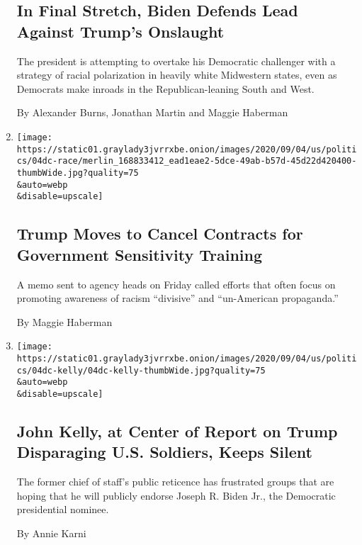 \begin{enumerate}
  \hypertarget{in-final-stretch-biden-defends-lead-against-trumps-onslaught}{%
  \subsection{In Final Stretch, Biden Defends Lead Against Trump's
  Onslaught}\label{in-final-stretch-biden-defends-lead-against-trumps-onslaught}}

  The president is attempting to overtake his Democratic challenger with
  a strategy of racial polarization in heavily white Midwestern states,
  even as Democrats make inroads in the Republican-leaning South and
  West.

  By Alexander Burns, Jonathan Martin and Maggie Haberman
\item
  \href{/2020/09/04/us/politics/trump-race-sensitivity-training.html}{}

  \texttt{[image: https://static01.graylady3jvrrxbe.onion/images/2020/09/04/us/politics/04dc-race/merlin\_168833412\_ead1eae2-5dce-49ab-b57d-45d22d420400-thumbWide.jpg?quality=75\\\&auto=webp\\\&disable=upscale]}

  \hypertarget{trump-moves-to-cancel-contracts-for-government-sensitivity-training}{%
  \subsection{Trump Moves to Cancel Contracts for Government Sensitivity
  Training}\label{trump-moves-to-cancel-contracts-for-government-sensitivity-training}}

  A memo sent to agency heads on Friday called efforts that often focus
  on promoting awareness of racism ``divisive'' and ``un-American
  propaganda.''

  By Maggie Haberman
\item
  \href{/2020/09/04/us/politics/kelly-trump.html}{}

  \texttt{[image: https://static01.graylady3jvrrxbe.onion/images/2020/09/04/us/politics/04dc-kelly/04dc-kelly-thumbWide.jpg?quality=75\\\&auto=webp\\\&disable=upscale]}

  \hypertarget{john-kelly-at-center-of-report-on-trump-disparaging-us-soldiers-keeps-silent}{%
  \subsection{John Kelly, at Center of Report on Trump Disparaging U.S.
  Soldiers, Keeps
  Silent}\label{john-kelly-at-center-of-report-on-trump-disparaging-us-soldiers-keeps-silent}}

  The former chief of staff's public reticence has frustrated groups
  that are hoping that he will publicly endorse Joseph R. Biden Jr., the
  Democratic presidential nominee.

  By Annie Karni
\end{enumerate}

